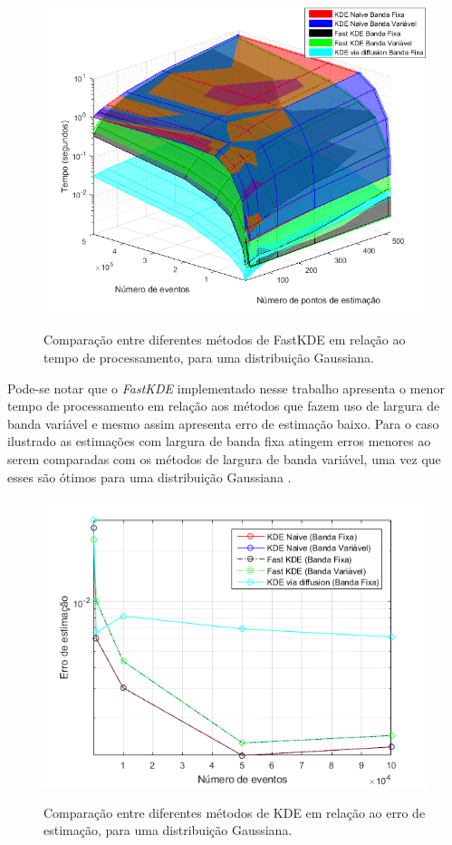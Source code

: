 \begin{figure}[!ht]
	\centering
	\includegraphics[width=12cm]{./textuais/desenvolvimento/figuras/compKDE.png}\\
	\caption{Comparação entre diferentes métodos de FastKDE em relação ao tempo de processamento, para uma distribuição Gaussiana.}
	\label{fig:compKDE}
\end{figure}

Pode-se notar que o \textit{FastKDE} implementado nesse trabalho apresenta o menor tempo de processamento em relação aos métodos que fazem uso de largura de banda variável e mesmo assim apresenta erro de estimação baixo. Para o caso ilustrado as estimações com largura de banda fixa atingem erros menores ao serem comparadas com os métodos de largura de banda variável, uma vez que esses são ótimos para uma distribuição Gaussiana \cite{scott2015multivariate}.

\begin{figure}[!ht]
	\centering
	\includegraphics[width=12cm]{./textuais/desenvolvimento/figuras/erroKDE.png}\\
	\caption{Comparação entre diferentes métodos de KDE em relação ao erro de estimação, para uma distribuição Gaussiana.}
	\label{fig:erroKDE}
\end{figure}

